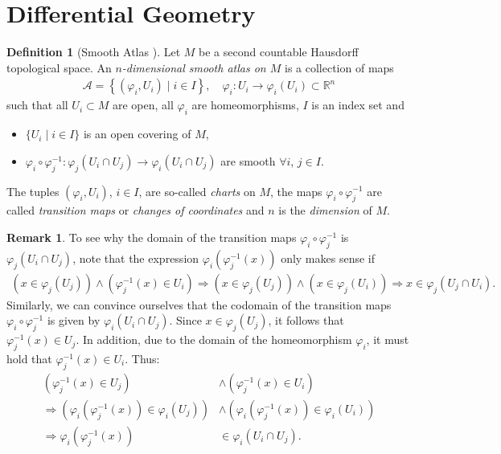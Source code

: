 \documentclass[12pt, a4paper]{article}
\numberwithin{equation}{section}
\theoremstyle{definition}
\theoremstyle{definition}
\newtheorem{defn}[thm]{Definition} %
\newtheorem{remark}[thm]{Remark} %
\begin{document}
	\section{Differential Geometry}
	\begin{samepage}
		\begin{defn}[Smooth Atlas \cite{Lindemann-lec1}]
			Let $M$ be a second countable Hausdorff topological space. An \textit{$n$-dimensional smooth atlas on $M$}  is a collection of maps
			\begin{align*}
				\mathcal A = \left\{\left(\varphi_i, U_i\right)\mid i\in I\right\}, \quad \varphi_i: U_i \rightarrow \varphi_i(U_i) \subset \mathbb R^n
			\end{align*}
			such that all $U_i \subset M$ are open, all $\varphi_i$ are homeomorphisms, $I$ is an index set and 
			\begin{itemize}
				\item $\{U_i \mid i\in I\}$ is an open covering of $M$, 
				\item $\varphi_i \circ \varphi_j^{-1}: \varphi_j(U_i \cap U_j) \rightarrow \varphi_i(U_i \cap U_j)$ are smooth $\forall i$, $j \in I$. 
			\end{itemize}
			The tuples $(\varphi_i, U_i)$, $i\in I$, are so-called \textit{charts} on $M$, the maps $\varphi_i\circ \varphi_j^{-1}$ are called \textit{transition maps} or \textit{changes of coordinates} and $n$ is the \textit{dimension} of $M$.
		\end{defn}
	\end{samepage}

	\begin{remark}
		To see why the domain of the transition maps $\varphi_i \circ \varphi_j^{-1}$ is $\varphi_j\left(U_i \cap U_j\right)$, note that the expression $\varphi_i\left(\varphi_j^{-1}\left(x\right)\right)$ only makes sense if 
		\begin{align*}
			\left(x\in \varphi_j(U_j)\right) \wedge  \left(\varphi_j^{-1}\left(x\right)\in U_i\right) \Rightarrow \left(x\in \varphi_j(U_j)\right) \wedge \left(x\in \varphi_j\left(U_i\right)\right) \Rightarrow x\in \varphi_j(U_j \cap U_i). 
		\end{align*}
		Similarly, we can convince ourselves that the codomain of the transition maps $\varphi_i\circ\varphi_j^{-1}$ is given by $\varphi_i(U_i\cap U_j)$. Since $x\in \varphi_j(U_j)$, it follows that $\varphi_j^{-1}(x)\in U_j$. In addition, due to the domain of the homeomorphism $\varphi_i$, it must hold that $\varphi_j^{-1}(x) \in U_i$. Thus: 
		\begin{align*}
			\left(\varphi_j^{-1}(x)\in U_j\right) &\wedge \left(\varphi_j^{-1}(x) \in U_i\right) 
			\\
			\Rightarrow 			\left(\varphi_i(\varphi_j^{-1}(x))\in \varphi_i(U_j)\right) &\wedge \left(\varphi_i(\varphi_j^{-1}(x))\in \varphi_i(U_i)\right) 
			\\ 
			\Rightarrow \varphi_i\left(\varphi_j^{-1}(x)\right) &\in \varphi_i\left(U_i\cap U_j\right). 
		\end{align*}
	\end{remark}
	
\end{document}

